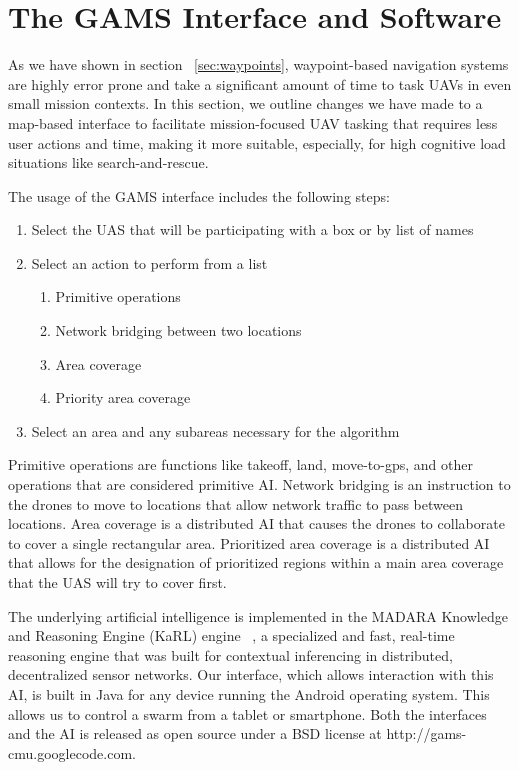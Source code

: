\documentclass{sig-alternate-ipsn13}
\begin{document}
\section{The GAMS Interface and Software}
\label{sec:gams_interface}

As we have shown in section ~\ref{sec:waypoints}, waypoint-based
navigation systems are highly error prone and take a significant amount
of time to task UAVs in even small mission contexts. In this section, we
outline changes we have made to a map-based interface to facilitate
mission-focused UAV tasking that requires less user actions and time,
making it more suitable, especially, for high cognitive load situations like
search-and-rescue.

The usage of the GAMS interface includes the following steps:
\begin{enumerate}
  \item Select the UAS that will be participating with a box or by list of names
  \item Select an action to perform from a list
  \begin{enumerate}
    \item Primitive operations
    \item Network bridging between two locations
    \item Area coverage
    \item Priority area coverage
  \end{enumerate}
  \item Select an area and any subareas necessary for the algorithm
\end{enumerate}

Primitive operations are functions like takeoff, land, move-to-gps, and other
operations that are considered primitive AI. Network bridging is an instruction
to the drones to move to locations that allow network traffic to pass between
locations. Area coverage is a distributed AI that causes the drones to collaborate
to cover a single rectangular area. Prioritized area coverage is a distributed AI
that allows for the designation of prioritized regions within a main area coverage
that the UAS will try to cover first.

The underlying artificial intelligence is implemented in the MADARA Knowledge and
Reasoning Engine (KaRL) engine ~\cite{Edmondson-KaRL-ksem2011}, a specialized
and fast, real-time reasoning engine that was built for contextual inferencing in
distributed, decentralized sensor networks. Our interface, which allows
interaction with this AI, is built in Java for any device running the Android
operating system. This allows us to control a swarm from a tablet or smartphone.
Both the interfaces and the AI is released as open source under a BSD license
at http://gams-cmu.googlecode.com.
\end{document}
